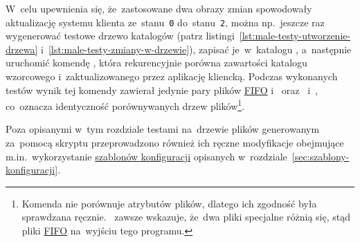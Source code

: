 \documentclass[thesis]{subfiles}
\begin{document}
W~celu upewnienia się, że~zastosowane dwa obrazy zmian spowodowały aktualizację systemu klienta ze~stanu~\texttt{0} do~stanu~\texttt{2}, można np.~jeszcze raz wygenerować testowe drzewo katalogów (patrz listingi~\ref{lst:male-testy-utworzenie-drzewa} i~\ref{lst:male-testy-zmiany-w-drzewie}), zapisać je~w~katalogu , a~następnie uruchomić komendę , która rekurencyjnie porówna zawartości katalogu wzorcowego i~zaktualizowanego przez aplikację kliencką. Podczas wykonanych testów wynik tej komendy zawierał jedynie pary plików \href{https://en.wikipedia.org/wiki/Named_pipe}{FIFO}  i~ oraz~ i~, co~oznacza identyczność porównywanych drzew plików\footnote{Komenda  nie porównuje atrybutów plików, dlatego ich zgodność była sprawdzana ręcznie. ~zawsze wskazuje, że~dwa pliki specjalne różnią się, stąd pliki \href{https://en.wikipedia.org/wiki/Named_pipe}{FIFO} na~wyjściu tego programu.}.

Poza opisanymi w~tym rozdziale testami na~drzewie plików generowanym za~pomocą skryptu  przeprowadzono również ich ręczne modyfikacje obejmujące m.in.~wykorzystanie \hyperref[sec:szablony-konfiguracji]{szablonów konfiguracji} opisanych w~rozdziale~\ref{sec:szablony-konfiguracji}.
\end{document}
